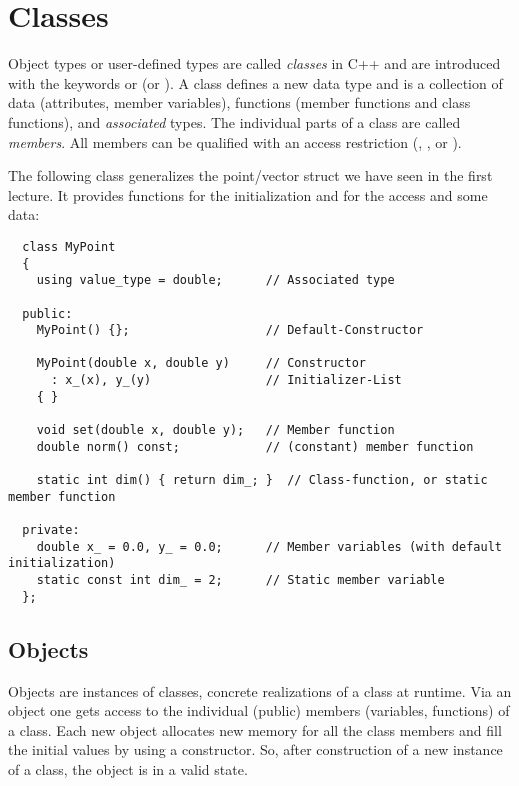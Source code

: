 \chapter{Classes\label{sec:class}}
Object types or user-defined types are called \emph{classes} in C++ and are introduced with the keywords  or  (or ).
A class defines a new data type and is a collection of data (attributes, member variables), functions (member functions and class functions),
and \textit{associated} types. The individual parts of a class are called \emph{members}. All members can be qualified with an access restriction
(, , or ).

\begin{example}
The following class generalizes the point/vector struct we have seen in the first lecture. It provides functions for the initialization and for
the access and some data:
\end{example}
\begin{verbatim}
  class MyPoint
  {
    using value_type = double;      // Associated type

  public:
    MyPoint() {};                   // Default-Constructor

    MyPoint(double x, double y)     // Constructor
      : x_(x), y_(y)                // Initializer-List
    { }

    void set(double x, double y);   // Member function
    double norm() const;            // (constant) member function

    static int dim() { return dim_; }  // Class-function, or static member function

  private:
    double x_ = 0.0, y_ = 0.0;      // Member variables (with default initialization)
    static const int dim_ = 2;      // Static member variable
  };
\end{verbatim}


\section{Objects\label{sec:class-object}}
Objects are instances of classes, \ie concrete realizations of a class at runtime. Via an object one gets access to the individual (public) members
(variables, functions) of a class. Each new object allocates new memory for all the class members and fill the initial values by using a constructor.
So, after construction of a new instance of a class, the object is in a valid state.

